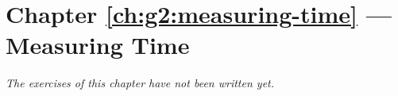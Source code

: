 \section*{Chapter \ref{ch:g2:measuring-time} --- Measuring Time}


\emph{The exercises of this chapter have not been written yet.}
